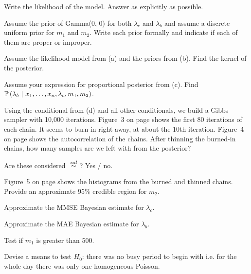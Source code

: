 \documentclass[12pt]{article}
\begin{document}
 Write the likelihood of the model. Answer as explicitly as possible. 

 Assume the prior of Gamma(0, 0) for both $\lambda_c$ and $\lambda_b$ and assume a discrete uniform prior for $m_1$ and $m_2$. Write each prior formally and indicate if each of them are proper or improper. 


 Assume the likelihood model from (a) and the priors from (b). Find the kernel of the posterior. 


 Assume your expression for proportional posterior from (c). Find $\mathbb{P}\left(\lambda_b~|~x_1, \ldots, x_n, \lambda_c, m_1, m_2\right)$. 

 Using the conditional from (d) and all other conditionals, we build a Gibbs sampler with 10,000 iterations. Figure~3 on page \pageref{fig:burn} shows the first 80 iterations of each chain. It seems to burn in right away, at about the 10th iteration. Figure~4 on page \pageref{fig:acf} shows the autocorrelation of the chains. After thinning the burned-in chains, how many samples are we left with from the posterior? 

 Are these  considered $\iid$? Yes / no.

 Figure~5 on page \pageref{fig:marginals} shows the histograms from the burned and thinned chains. Provide an approximate 95\% credible region for $m_2$.  

 Approximate the MMSE Bayesian estimate for $\lambda_c$.  

 Approximate the MAE Bayesian estimate for $\lambda_b$.  

 Test if $m_1$ is greater than 500.  

 Devise a means to test $H_0$: there was no busy period to begin with i.e. for the whole day there was only one homogeneous Poisson.

\eenum
\end{document}
